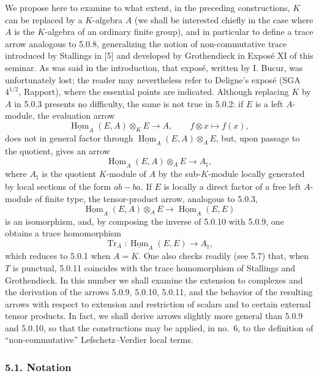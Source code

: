 \documentclass[11pt]{article}
\providecommand{\uHom}{\underline{\Hom}}
\DeclareMathOperator{\Hom}{Hom}
\providecommand{\Tr}{\operatorname{Tr}}
\providecommand{\Tr}{\operatorname{Tr}}
\providecommand{\Tr}{\operatorname{Tr}}
\providecommand{\Hom}{\operatorname{Hom}}
\providecommand{\Tr}{\operatorname{Tr}}
\providecommand{\Hom}{\operatorname{Hom}}
\providecommand{\Tr}{\operatorname{Tr}}
\begin{document}
We propose here to examine to what extent, in the preceding constructions, $K$ can be replaced by a $K$-algebra $A$ (we shall be interested chiefly in the case where $A$ is the $K$-algebra of an ordinary finite group), and in particular to define a trace arrow analogous to 5.0.8, generalizing the notion of non-commutative trace introduced by Stallings in [5] and developed by Grothendieck in Expos\'e XI of this seminar. As was said in the introduction, that expos\'e, written by I. Bucur, was unfortunately lost; the reader may nevertheless refer to Deligne's expos\'e (SGA $4^{1/2}$, Rapport), where the essential points are indicated. Although replacing $K$ by $A$ in 5.0.3 presents no difficulty, the same is not true in 5.0.2: if $E$ is a left $A$-module, the evaluation arrow
\[
\uHom_A(E,A)\otimes_KE\longrightarrow A,
\qquad f\otimes x\longmapsto f(x),
\]
does not in general factor through $\uHom_A(E,A)\otimes_AE$, but, upon passage to the quotient, gives an arrow
\begin{equation}\tag{5.0.9}
\uHom_A(E,A)\otimes_AE\longrightarrow A_\natural,
\end{equation}
where $A_\natural$ is the quotient $K$-module of $A$ by the sub-$K$-module locally generated by local sections of the form $ab-ba$. If $E$ is locally a direct factor of a free left $A$-module of finite type, the tensor-product arrow, analogous to 5.0.3,
\begin{equation}\tag{5.0.10}
\uHom_A(E,A)\otimes_AE\longrightarrow\uHom_A(E,E)
\end{equation}
is an isomorphism, and, by composing the inverse of 5.0.10 with 5.0.9, one obtains a trace homomorphism
\begin{equation}\tag{5.0.11}
\Tr_A:\uHom_A(E,E)\longrightarrow A_\natural,
\end{equation}
which reduces to 5.0.1 when $A=K$. One also checks readily (see 5.7) that, when $T$ is punctual, 5.0.11 coincides with the trace homomorphism of Stallings and Grothendieck. In this number we shall examine the extension to complexes and the derivation of the arrows 5.0.9, 5.0.10, 5.0.11, and the behavior of the resulting arrows with respect to extension and restriction of scalars and to certain external tensor products. In fact, we shall derive arrows slightly more general than 5.0.9 and 5.0.10, so that the constructions may be applied, in no.~6, to the definition of ``non-commutative'' Lefschetz--Verdier local terms.

\subsubsection*{5.1. Notation}
\end{document}
